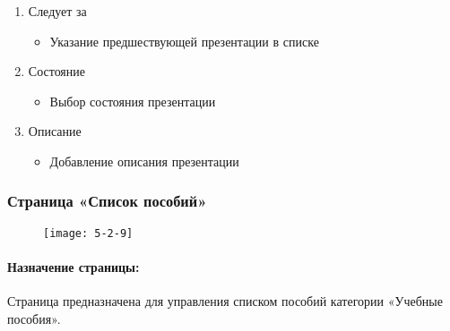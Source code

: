 \begin{enumerate}
\begin{enumerate}
\begin{enumerate}
			\item Следует за
			\begin{itemize}
				\item Указание предшествующей презентации в списке
			\end{itemize}

			\item Состояние
			\begin{itemize}
				\item Выбор состояния презентации
			\end{itemize}

			\item Описание
			\begin{itemize}
				\item Добавление описания презентации
			\end{itemize}


		\end{enumerate}
	\end{enumerate}
\end{enumerate}


\subsubsection{Страница «Список пособий»}
\begin{figure}[H]
	\texttt{[image: 5-2-9]}
\end{figure}
\paragraph{Назначение страницы:} Страница предназначена для управления списком пособий категории «Учебные пособия».

